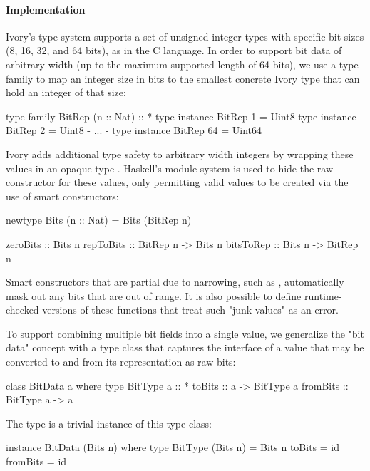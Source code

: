 \paragraph{Implementation}
Ivory's type system supports a set of unsigned integer types with
specific bit sizes (8, 16, 32, and 64 bits), as in the C language.
In order to support bit data of arbitrary width (up to the maximum
supported length of 64 bits), we use a type family
 to map an integer size in bits to the smallest
concrete Ivory type that can hold an integer of that size:

\begin{code}
type family BitRep (n :: Nat) :: *
type instance BitRep 1 = Uint8
type instance BitRep 2 = Uint8
{- ... -}
type instance BitRep 64 = Uint64
\end{code}

Ivory adds additional type safety to arbitrary width integers by
wrapping these values in an opaque type .
Haskell's module system is used to hide the raw constructor for
these values, only permitting valid values to be created via the
use of smart constructors:

\begin{code}
newtype Bits (n :: Nat) = Bits (BitRep n)

zeroBits :: Bits n
repToBits :: BitRep n -> Bits n
bitsToRep :: Bits n -> BitRep n
\end{code}

Smart constructors that are partial due to narrowing,
such as , automatically mask out any bits that are
out of range. It is also possible to define runtime-checked versions
of these functions that treat such "junk values" as an error.

To support combining multiple bit fields into a single value, we
generalize the "bit data" concept with a type class 
that captures the interface of a value that may be converted to
and from its representation as raw bits:

\begin{code}
class BitData a where
  type BitType a :: *
  toBits :: a -> BitType a
  fromBits :: BitType a -> a
\end{code}

The  type is a trivial instance of this type class:

\begin{code}
instance BitData (Bits n) where
  type BitType (Bits n) = Bits n
  toBits   = id
  fromBits = id
\end{code}


